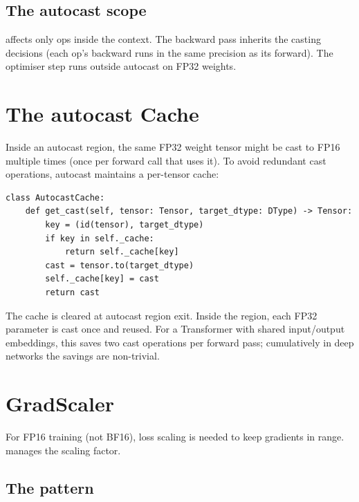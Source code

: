 \subsection{The autocast scope}
\label{ssec:amp:scope}

 affects only ops inside the context. The
backward pass inherits the casting decisions (each op's backward
runs in the same precision as its forward). The optimiser step
runs outside autocast on FP32 weights.

\section{The autocast Cache}
\label{sec:amp:autocast_cache}

Inside an autocast region, the same FP32 weight tensor might
be cast to FP16 multiple times (once per forward call that
uses it). To avoid redundant cast operations, autocast
maintains a per-tensor cache:

\begin{lstlisting}[style=lucid,language=LucidPython]
class AutocastCache:
    def get_cast(self, tensor: Tensor, target_dtype: DType) -> Tensor:
        key = (id(tensor), target_dtype)
        if key in self._cache:
            return self._cache[key]
        cast = tensor.to(target_dtype)
        self._cache[key] = cast
        return cast
\end{lstlisting}

The cache is cleared at autocast region exit. Inside the
region, each FP32 parameter is cast once and reused. For a
Transformer with shared input/output embeddings, this saves
two cast operations per forward pass; cumulatively in deep
networks the savings are non-trivial.

\section{GradScaler}
\label{sec:amp:grad_scaler}

For FP16 training (not BF16), loss scaling is needed to keep
gradients in range.  manages the
scaling factor.

\subsection{The pattern}
\label{ssec:amp:scaler_pattern}

